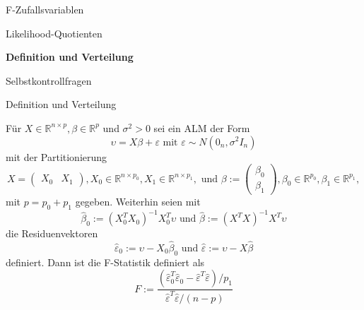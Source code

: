 \documentclass[
  8pt,
  ignorenonframetext,
]{beamer}
\begin{document}
\begin{frame}{}
\protect\hypertarget{section-11}{}
\vfill
\large
{}

F-Zufallsvariablen

Likelihood-Quotienten

\textbf{Definition und Verteilung}

Selbstkontrollfragen \vfill
\end{frame}

\begin{frame}{Definition und Verteilung}
\protect\hypertarget{definition-und-verteilung}{}
\footnotesize
\begin{definition}[F-Statistik]
Für $X \in \mathbb{R}^{n \times p}, \beta \in \mathbb{R}^p$ und $\sigma^2 > 0$
sei ein ALM der Form
\begin{equation}
\upsilon = X\beta + \varepsilon \mbox{ mit } \varepsilon \sim N(0_n,\sigma^2I_n)
\end{equation}
mit der Partitionierung
\begin{equation}
X      = \begin{pmatrix} X_0     & X_1      \end{pmatrix},
X_0      \in \mathbb{R}^{n\times p_0},
X_1      \in \mathbb{R}^{n\times p_1},
\mbox{ und }
\beta := \begin{pmatrix} \beta_0 \\ \beta_1 \end{pmatrix},
\beta_0 \in \mathbb{R}^{p_0},
\beta_1 \in \mathbb{R}^{p_1},
\end{equation}
mit $p = p_0 + p_1$ gegeben. Weiterhin seien mit
\begin{equation}
\hat{\beta}_0 := (X_0^TX_0)^{-1} X_0^T\upsilon \mbox{ und } \hat{\beta} := (X^TX)^{-1}X^T\upsilon
\end{equation}
die Residuenvektoren
\begin{equation}
\hat{\varepsilon}_0 := \upsilon - X_0\hat{\beta}_0 \mbox{ und } \hat{\varepsilon} := \upsilon - X\hat{\beta}
\end{equation}
definiert. Dann ist die F-Statistik definiert als
\begin{equation}
F := \frac{(\hat{\varepsilon}_0^T\hat{\varepsilon}_0-\hat{\varepsilon}^T\hat{\varepsilon})/p_1}{\hat{\varepsilon}^T\hat{\varepsilon}/(n-p)}
\end{equation}
\end{definition}
\end{frame}
\end{document}
